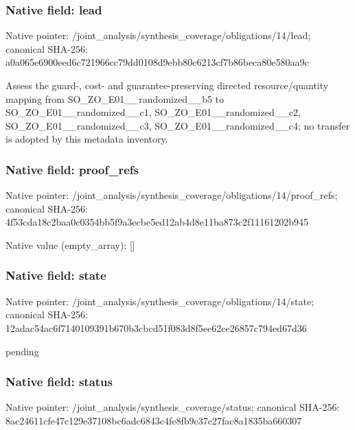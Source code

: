 \documentclass[10pt,a4paper]{article}
\begin{document}
\subsubsection{Native field: lead}
Native pointer: /joint\_\allowbreak{}analysis/synthesis\_\allowbreak{}coverage/obligations/14/lead; canonical SHA-256: a0a065e6900eed6c721966cc79dd0108d9ebb80c6213cf7b86beca80e580aa9c

\begingroup\raggedright\sloppy Assess the guard-,\allowbreak{} cost- and guarantee-preserving directed resource/\allowbreak{}quantity mapping from SO\_\allowbreak{}ZO\_\allowbreak{}E01\_\allowbreak{}\_\allowbreak{}randomized\_\allowbreak{}\_\allowbreak{}b5 to SO\_\allowbreak{}ZO\_\allowbreak{}E01\_\allowbreak{}\_\allowbreak{}randomized\_\allowbreak{}\_\allowbreak{}c1,\allowbreak{} SO\_\allowbreak{}ZO\_\allowbreak{}E01\_\allowbreak{}\_\allowbreak{}randomized\_\allowbreak{}\_\allowbreak{}c2,\allowbreak{} SO\_\allowbreak{}ZO\_\allowbreak{}E01\_\allowbreak{}\_\allowbreak{}randomized\_\allowbreak{}\_\allowbreak{}c3,\allowbreak{} SO\_\allowbreak{}ZO\_\allowbreak{}E01\_\allowbreak{}\_\allowbreak{}randomized\_\allowbreak{}\_\allowbreak{}c4;\allowbreak{} no transfer is adopted by this metadata inventory.\par\endgroup

\subsubsection{Native field: proof\_\allowbreak{}refs}
Native pointer: /joint\_\allowbreak{}analysis/synthesis\_\allowbreak{}coverage/obligations/14/proof\_\allowbreak{}refs; canonical SHA-256: 4f53cda18c2baa0c0354bb5f9a3ecbe5ed12ab4d8e11ba873c2f11161202b945

Native value (empty\_\allowbreak{}array): []

\subsubsection{Native field: state}
Native pointer: /joint\_\allowbreak{}analysis/synthesis\_\allowbreak{}coverage/obligations/14/state; canonical SHA-256: 12adac54ac6f7140109391b670b3cbcd51f083d8f5ee62ce26857c794ed67d36

\begingroup\raggedright\sloppy pending\par\endgroup

\subsubsection{Native field: status}
Native pointer: /joint\_\allowbreak{}analysis/synthesis\_\allowbreak{}coverage/status; canonical SHA-256: 8ac24611cfe47c129e37108bc6adc6843c4fe8fb9c37c27fac8a1835ba660307
\end{document}
